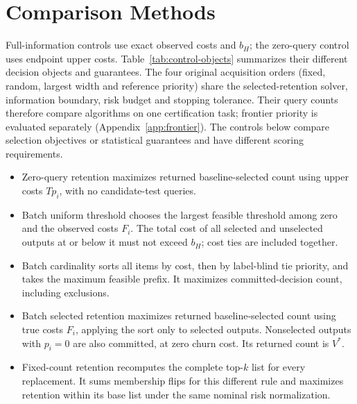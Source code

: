 \section{Comparison Methods}
\label{app:baselines}
Full-information controls use exact observed costs and $b_H$; the zero-query control uses endpoint upper costs. Table~\ref{tab:control-objects} summarizes their different decision objects and guarantees. The four original acquisition orders (fixed, random, largest width and reference priority) share the selected-retention solver, information boundary, risk budget and stopping tolerance. Their query counts therefore compare algorithms on one certification task; frontier priority is evaluated separately (Appendix~\ref{app:frontier}). The controls below compare selection objectives or statistical guarantees and have different scoring requirements.
\begin{itemize}
\item Zero-query retention maximizes returned baseline-selected count using upper costs $Tp_i$, with no candidate-test queries.
\item Batch uniform threshold chooses the largest feasible threshold among zero and the observed costs $F_i$. The total cost of all selected and unselected outputs at or below it must not exceed $b_H$; cost ties are included together.
\item Batch cardinality sorts all items by cost, then by label-blind tie priority, and takes the maximum feasible prefix. It maximizes committed-decision count, including exclusions.
\item Batch selected retention maximizes returned baseline-selected count using true costs $F_i$, applying the sort only to selected outputs. Nonselected outputs with $p_i=0$ are also committed, at zero churn cost. Its returned count is $V^*$.
\item Fixed-count retention recomputes the complete top-$k$ list for every replacement. It sums membership flips for this different rule and maximizes retention within its base list under the same nominal risk normalization.
\end{itemize}

